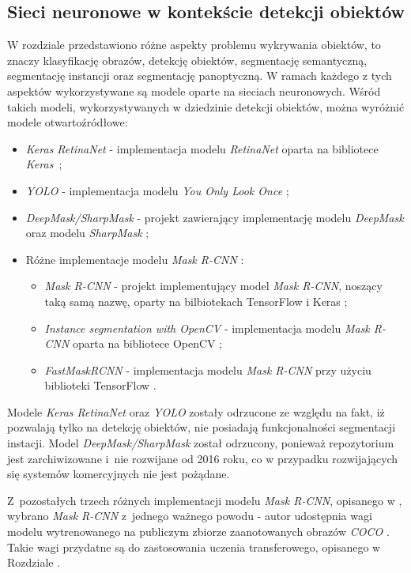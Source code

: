 \subsection{Sieci neuronowe w kontekście detekcji obiektów}

W rozdziale  przedstawiono różne aspekty problemu wykrywania obiektów, to znaczy klasyfikację obrazów, detekcję obiektów, segmentację semantyczną, segmentację instancji oraz segmentację panoptyczną. W ramach każdego z tych aspektów wykorzystywane są modele oparte na sieciach neuronowych. Wśród takich modeli, wykorzystywanych w dziedzinie detekcji obiektów, można wyróżnić modele otwartoźródłowe:

\begin{itemize}
	\item \textit{Keras RetinaNet} \cite{keras-retinanet-implementation} - implementacja modelu \textit{RetinaNet} \cite{keras-retinanet} oparta na bibliotece \textit{Keras}~\cite{keras};
	\item \textit{YOLO} \cite{yolo-implementation} - implementacja modelu \textit{You Only Look Once} \cite{yolo};
	\item \textit{DeepMask/SharpMask} \cite{deep-sharp-mask} - projekt zawierający implementację modelu \textit{DeepMask} \cite{deepmask} oraz modelu \textit{SharpMask} \cite{sharpmask};
	\item Różne implementacje modelu \textit{Mask R-CNN} \cite{general-mask-rcnn}:
		\begin{itemize}
			\item \textit{Mask R-CNN} \cite{matterport-mask-rcnn} - projekt implementujący model \textit{Mask R-CNN}, noszący taką samą nazwę, oparty na bilbiotekach TensorFlow \cite{tensorflow} i Keras \cite{keras};
			\item \textit{Instance segmentation with OpenCV} \cite{mask-rcnn-opencv} - implementacja modelu \textit{Mask R-CNN} oparta na bibliotece OpenCV \cite{opencv};
			\item \textit{FastMaskRCNN} \cite{fast-mask-rcnn} - implementacja modelu \textit{Mask R-CNN} przy użyciu biblioteki TensorFlow \cite{tensorflow}.
		\end{itemize}
\end{itemize}

Modele \textit{Keras RetinaNet} oraz \textit{YOLO} zostały odrzucone ze względu na fakt, iż pozwalają tylko na detekcję obiektów, nie posiadają funkcjonalności segmentacji instacji.
Model \textit{DeepMask/SharpMask} został odrzucony, ponieważ repozytorium jest zarchiwizowane i~nie rozwijane od 2016 roku, co w przypadku rozwijających się systemów komercyjnych nie jest pożądane.

Z~pozostałych trzech różnych implementacji modelu \textit{Mask R-CNN}, opisanego w \cite{general-mask-rcnn}, wybrano \textit{Mask R-CNN} \cite{matterport-mask-rcnn} z~jednego ważnego powodu - autor udostępnia wagi modelu wytrenowanego na publiczym zbiorze zaanotowanych obrazów \textit{COCO} \cite{coco}. Takie wagi przydatne są do zastosowania uczenia transferowego, opisanego w Rozdziale .
